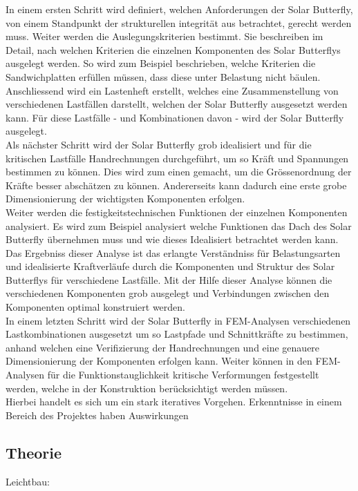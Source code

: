 In einem ersten Schritt wird definiert, welchen Anforderungen der Solar Butterfly, von einem Standpunkt der strukturellen integrität aus betrachtet, gerecht werden muss. Weiter werden die Auslegungskriterien bestimmt. Sie beschreiben im Detail, nach welchen Kriterien die einzelnen Komponenten des Solar Butterflys ausgelegt werden. So wird zum Beispiel beschrieben, welche Kriterien die Sandwichplatten erfüllen müssen, dass diese unter Belastung nicht bäulen.\\
Anschliessend wird ein Lastenheft erstellt, welches eine Zusammenstellung von verschiedenen Lastfällen darstellt, welchen der Solar Butterfly ausgesetzt werden kann. Für diese Lastfälle - und Kombinationen davon - wird der Solar Butterfly ausgelegt.\\
Als nächster Schritt wird der Solar Butterfly grob idealisiert und für die kritischen Lastfälle Handrechnungen durchgeführt, um so Kräft und Spannungen bestimmen zu können. Dies wird zum einen gemacht, um die Grössenordnung der Kräfte besser abschätzen zu können. Andererseits kann dadurch eine erste grobe Dimensionierung der wichtigsten Komponenten erfolgen.\\
Weiter werden die festigkeitstechnischen Funktionen der einzelnen Komponenten analysiert. Es wird zum Beispiel analysiert welche Funktionen das Dach des Solar Butterfly übernehmen muss und wie dieses Idealisiert betrachtet werden kann. Das Ergebniss dieser Analyse ist das erlangte Verständniss für Belastungsarten und idealisierte Kraftverläufe durch die Komponenten und Struktur des Solar Butterflys für verschiedene Lastfälle. Mit der Hilfe dieser Analyse können die verschiedenen Komponenten grob ausgelegt und Verbindungen zwischen den Komponenten optimal konstruiert werden.\\
In einem letzten Schritt wird der Solar Butterfly in FEM-Analysen verschiedenen Lastkombinationen ausgesetzt um so Lastpfade und Schnittkräfte zu bestimmen, anhand welchen eine Verifizierung der Handrechnungen und eine genauere Dimensionierung der Komponenten erfolgen kann. Weiter können in den FEM-Analysen für die Funktionstauglichkeit kritische Verformungen festgestellt werden, welche in der Konstruktion berücksichtigt werden müssen.\\

Hierbei handelt es sich um ein stark iteratives Vorgehen. Erkenntnisse in einem Bereich des Projektes haben Auswirkungen


\subsection{Theorie}
Leichtbau:

